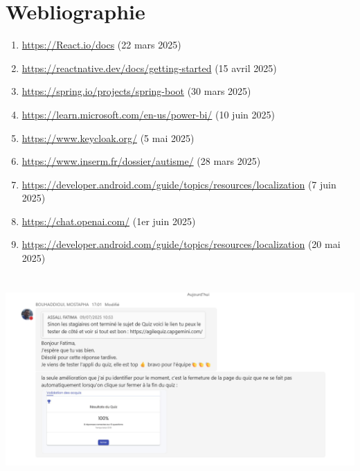 \documentclass[12pt,a4paper,twoside]{report}
\begin{document}
\hypertarget{webliographie}{%
\section{Webliographie}\label{webliographie}}

\begin{enumerate}
\def\labelenumi{\arabic{enumi}.}
\item
  \href{https://angular.io/docs}{https://React.io/docs} (22 mars 2025)
\item
  \url{https://reactnative.dev/docs/getting-started} (15 avril 2025)
\item
  \url{https://spring.io/projects/spring-boot} (30 mars 2025)
\item
  \url{https://learn.microsoft.com/en-us/power-bi/} (10 juin 2025)
\item
  \url{https://www.keycloak.org/} (5 mai 2025)
\item
  \url{https://www.inserm.fr/dossier/autisme/} (28 mars 2025)
\item
  \url{https://developer.android.com/guide/topics/resources/localization}
  (7 juin 2025)
\item
  \url{https://chat.openai.com/} (1er juin 2025)
\item
  \url{https://developer.android.com/guide/topics/resources/localization}
  (20 mai 2025)
\end{enumerate}

\includegraphics[width=6.3in,height=3.13056in]{latex_media/media/image66.png}
\end{document}
